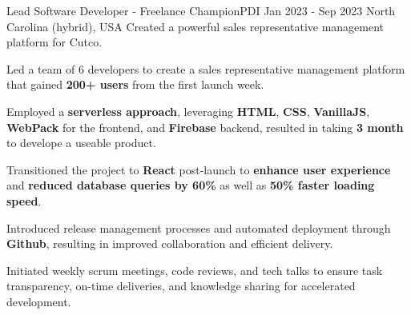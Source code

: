 
\begin{cventries}
  \cventry
    {Lead Software Developer - Freelance} %
    {ChampionPDI} %
    {Jan 2023 - Sep 2023} %
    {North Carolina (hybrid), USA} %
    {Created a powerful sales representative management platform for Cutco.}
    {
      \begin{cvitems} %
        \item {Led a team of 6 developers to create a sales representative management platform that gained \textbf{200+ users} from the first launch week.}
        \item {Employed a \textbf{serverless approach}, leveraging \textbf{HTML}, \textbf{CSS}, \textbf{VanillaJS}, \textbf{WebPack} for the frontend, and \textbf{Firebase} backend, resulted in taking \textbf{3 month} to develope a useable product.}
        \item {Transitioned the project to \textbf{React} post-launch to \textbf{enhance user experience} and \textbf{reduced database queries by 60\%} as well as \textbf{50\% faster loading speed}.}
        \item {Introduced release management processes and automated deployment through \textbf{Github}, resulting in improved collaboration and efficient delivery.}
        \item {Initiated weekly scrum meetings, code reviews, and tech talks to ensure task transparency, on-time deliveries, and knowledge sharing for accelerated development.}
      \end{cvitems}
    }


\end{cventries}
